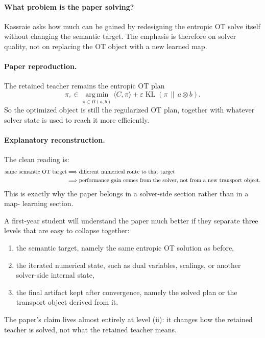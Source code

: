 \documentclass[11pt]{report}
\newcommand{\KL}{\operatorname{KL}}
\newcommand{\argmin}{\operatorname*{arg\,min}}
\begin{document}
\paragraph{What problem is the paper solving?}
Kassraie asks how much can be gained by redesigning the entropic OT solve itself
without changing the semantic target.  The emphasis is therefore on solver quality,
not on replacing the OT object with a new learned map.

\paragraph{Paper reproduction.}
The retained teacher remains the entropic OT plan
\begin{equation}
\pi_\varepsilon
\in
\argmin_{\pi\in\Pi(a,b)}
\langle C,\pi\rangle + \varepsilon \KL(\pi\,\|\,a\otimes b).
\label{eq:kassraie-entropic}
\end{equation}
So the optimized object is still the regularized OT plan, together with whatever
solver state is used to reach it more efficiently.

\paragraph{Explanatory reconstruction.}
The clean reading is:
\begin{align}
\text{same semantic OT target}
&\Longrightarrow
\text{different numerical route to that target}
\notag\\
&\Longrightarrow
\text{performance gain comes from the solver, not from a new transport object}.
\label{eq:kassraie-logic}
\end{align}
This is exactly why the paper belongs in a solver-side section rather than in a map-
learning section.

A first-year student will understand the paper much better if they separate three
levels that are easy to collapse together:
\begin{enumerate}[label=(\roman*)]
  \item the semantic target, namely the same entropic OT solution as before,
  \item the iterated numerical state, such as dual variables, scalings, or another solver-side internal state,
  \item the final artifact kept after convergence, namely the solved plan or the transport object derived from it.
\end{enumerate}
The paper's claim lives almost entirely at level (ii): it changes how the retained
teacher is solved, not what the retained teacher means.
\end{document}
